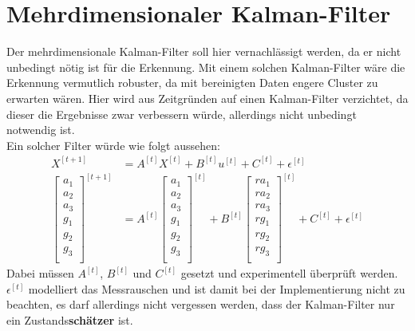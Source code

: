 \documentclass{article}
\begin{document}
\section{Mehrdimensionaler Kalman-Filter}
\label{sec:kalman}
Der mehrdimensionale Kalman-Filter soll hier vernachlässigt werden, da er nicht unbedingt nötig ist für die Erkennung.
Mit einem solchen Kalman-Filter wäre die Erkennung vermutlich robuster, da mit bereinigten Daten \glqq engere\grqq{} Cluster zu erwarten wären.
Hier wird aus Zeitgründen auf einen Kalman-Filter verzichtet, da dieser die Ergebnisse zwar verbessern würde, allerdings nicht unbedingt notwendig ist.\\
Ein solcher Filter würde wie folgt aussehen:
\begin{align*}
X^{[t+1]} &= A^{[t]}X^{[t]} + B^{[t]}u^{[t]} + C^{[t]} + \epsilon^{[t]}\\
\left[\begin{array}{r}
a_{1}\\
a_{2}\\
a_{3}\\
g_{1}\\
g_{2}\\
g_{3}\\
\end{array}\right]^{[t+1]}
&= A^{[t]} \left[\begin{array}{r}
a_{1}\\
a_{2}\\
a_{3}\\
g_{1}\\
g_{2}\\
g_{3}\\
\end{array}\right]^{[t]}
+ B^{[t]}\left[\begin{array}{r}
ra_{1}\\
ra_{2}\\
ra_{3}\\
rg_{1}\\
rg_{2}\\
rg_{3}\\
\end{array}\right]^{[t]}
+ C^{[t]} + \epsilon^{[t]}
\end{align*}
Dabei müssen $A^{[t]}$, $B^{[t]}$ und $C^{[t]}$ gesetzt und experimentell überprüft werden.
$\epsilon^{[t]}$ modelliert das Messrauschen und ist damit bei der Implementierung nicht zu beachten, es darf allerdings nicht vergessen werden, dass der Kalman-Filter nur ein Zustands\textbf{schätzer} ist.

\newpage
\end{document}
